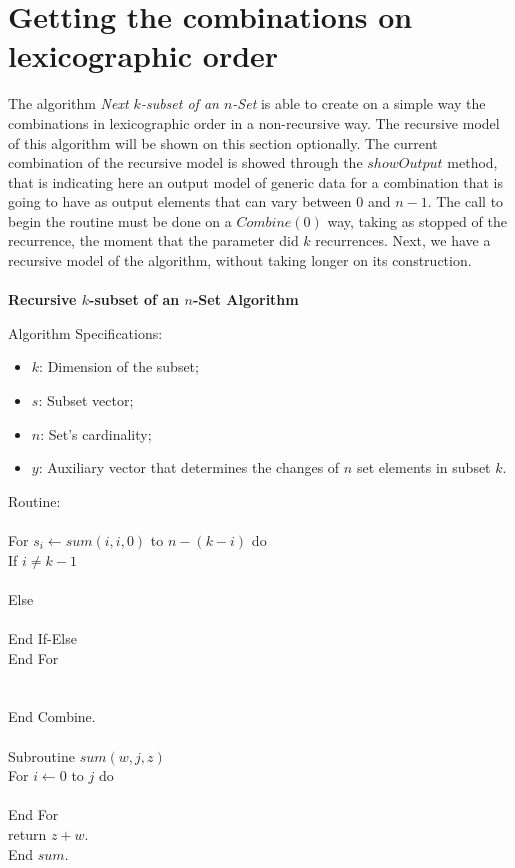 \documentclass {amsart}
\begin{document}
\section*{Getting the combinations on lexicographic order}

The algorithm \emph{Next {$k$}-subset of an {$n$}-Set}\cite{wi} is
able to create on a simple way the combinations in lexicographic
order in a non-recursive way. The recursive model of this
algorithm will be shown on this section optionally. The current
combination of the recursive model is showed through the
{$showOutput$} method, that is indicating here an output model of
generic data for a combination that is going to have as output
elements that can vary between {$0$} and {$n-1$}. The call to
begin the routine must be done on a {$Combine(0)$} way, taking as
stopped of the recurrence, the moment that the parameter did {$k$}
recurrences. Next, we have a recursive model of the algorithm,
without taking longer on its construction.\\\\
\textbf{Recursive {$k$}-subset of an {$n$}-Set Algorithm}

Algorithm Specifications:
\begin{itemize}

\item {$k$}: Dimension of the subset;

\item {$s$}: Subset vector;

\item {$n$}: Set's cardinality;

\item {$y$}: Auxiliary vector that determines the changes of {$n$}
set elements in subset {$k$}.

\end{itemize}
Routine:\\
 \\
\indent \indent For {$s_i \leftarrow sum(i,i,0)$} to {$n-(k-i)$} do \\
\indent \indent \indent If {$i \neq k-1$} \\
\indent \indent \indent {} \\
\indent \indent \indent Else \\
\indent \indent \indent {}\\
\indent \indent \indent End If-Else\\
\indent \indent End For\\
\indent {}\\
\indent {}\\
\indent End Combine. \\\\
\indent Subroutine {$sum(w,j,z)$}\\
\indent \indent For {$i \leftarrow 0$} to {$j$} do \\
\indent \indent {} \\
\indent \indent End For \\
\indent \indent return {$z+w$}.\\
\indent End {$sum$}.
\end{document}
